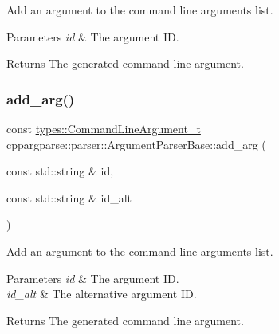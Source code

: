 Add an argument to the command line arguments list. 


\begin{DoxyParams}{Parameters}
{\em id} & The argument ID.\\
\hline
\end{DoxyParams}
\begin{DoxyReturn}{Returns}
The generated command line argument. 
\end{DoxyReturn}
\mbox{\label{classcppargparse_1_1parser_1_1ArgumentParserBase_a4a0c6460abc3808c017de576052fa131}} 
\subsubsection{\texorpdfstring{add\+\_\+arg()}{add\_arg()}\hspace{0.1cm}{\footnotesize\ttfamily [3/4]}}
{\footnotesize\ttfamily const \hyperlink{structcppargparse_1_1types_1_1CommandLineArgument__t}{types\+::\+Command\+Line\+Argument\+\_\+t} cppargparse\+::parser\+::\+Argument\+Parser\+Base\+::add\+\_\+arg (\begin{DoxyParamCaption}\item[{const std\+::string \&}]{id,  }\item[{const std\+::string \&}]{id\+\_\+alt }\end{DoxyParamCaption})\hspace{0.3cm}{\ttfamily [inline]}}



Add an argument to the command line arguments list. 


\begin{DoxyParams}{Parameters}
{\em id} & The argument ID. \\
\hline
{\em id\+\_\+alt} & The alternative argument ID.\\
\hline
\end{DoxyParams}
\begin{DoxyReturn}{Returns}
The generated command line argument. 
\end{DoxyReturn}
\mbox{\label{classcppargparse_1_1parser_1_1ArgumentParserBase_ad1bb9bf2be4793b3442679fa2090bc2d}} 
